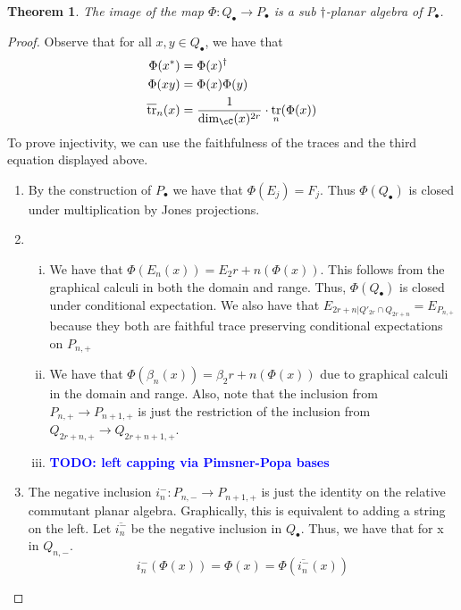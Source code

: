 \documentclass[11pt]{article}
\theoremstyle{plain}
\newtheorem{thm}{Theorem}[]
\theoremstyle{definition}
\DeclareMathOperator{\tr}{tr}
\newcommand{\todo}[1]{\textcolor{blue}{\textbf{TODO: #1}}}
\begin{document}
\begin{thm}
The image of the map $\Phi:Q_{\bullet} \to P_{\bullet}$ is a sub $\dagger$-planar algebra of $P_{\bullet}$.
\end{thm} 

\begin{proof}
Observe that for all $x,y \in Q_{\bullet}$, we have that 
\begin{align*}
	\Phi(x^{*}) &= \Phi(x)^{\dagger} \\
	\Phi(xy) &= \Phi(x)\Phi(y) \\
	\overline{\tr}_{n}(x) &= \frac{1}{\dim_\cC(x)^{2r}}\cdot\tr_{n}(\Phi(x)) 
\end{align*}
To prove injectivity, we can use the faithfulness of the traces and the third equation displayed above. \\
\begin{enumerate}[(1)]
\item By the construction of $P_{\bullet}$ we have that $\Phi(E_j)=F_j$. Thus $\Phi(Q_{\bullet})$ is closed under multiplication by Jones projections. \\ 
\item \begin{enumerate}[(i)]
\item We have that $\Phi(E_n(x)) = E_2r+n(\Phi(x))$. This follows from the graphical calculi in both the domain and range. Thus, $\Phi(Q_{\bullet})$ is closed under conditional expectation. We also have that $E_{2r+n | Q'_{2r}\cap Q_{2r+n}} = E_{P_{n,+}}$ because they both are faithful trace preserving conditional expectations on $P_{n,+}$\\ 
\item We have that $\Phi(\beta_n(x)) = \beta_2r+n(\Phi(x))$ due to graphical calculi in the domain and range. Also, note that the inclusion from $P_{n,+} \to P_{n+1,+}$ is just the restriction of the inclusion from $Q_{2r+n,+} \to Q_{2r+n+1,+}$. \\ 
\item \todo{left capping via Pimsner-Popa bases} \\
\end{enumerate}
\item The negative inclusion $i^{-}_{n} : P_{n,-} \to P_{n+1,+}$ is just the identity on the relative commutant planar algebra. Graphically, this is equivalent to adding a string on the left. Let $\overline{i^{-}_{n}}$ be the negative inclusion in $Q_{\bullet}$. Thus, we have that for x in $Q_{n,-}$.
\[ i^{-}_{n}(\Phi(x)) = \Phi(x) = \Phi(\overline{i^{-}_{n}}(x)) \]
\end{enumerate}
\end{proof}
\end{document}
